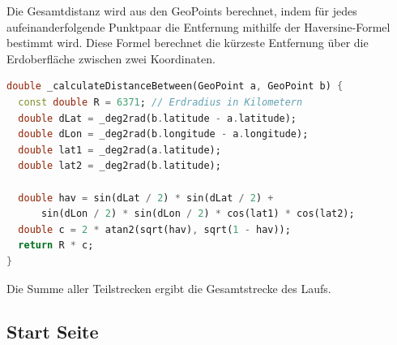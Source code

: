\documentclass[11pt,a4paper]{article}
\begin{document}
Die Gesamtdistanz wird aus den GeoPoints berechnet, indem für jedes aufeinanderfolgende Punktpaar die Entfernung mithilfe der Haversine-Formel bestimmt wird. Diese Formel berechnet die kürzeste Entfernung über die Erdoberfläche zwischen zwei Koordinaten.

\begin{lstlisting}[language=Dart, caption=Berechnung der Entfernung zweier GeoPoints]
double _calculateDistanceBetween(GeoPoint a, GeoPoint b) {
  const double R = 6371; // Erdradius in Kilometern
  double dLat = _deg2rad(b.latitude - a.latitude);
  double dLon = _deg2rad(b.longitude - a.longitude);
  double lat1 = _deg2rad(a.latitude);
  double lat2 = _deg2rad(b.latitude);

  double hav = sin(dLat / 2) * sin(dLat / 2) +
      sin(dLon / 2) * sin(dLon / 2) * cos(lat1) * cos(lat2);
  double c = 2 * atan2(sqrt(hav), sqrt(1 - hav));
  return R * c;
}
\end{lstlisting}

Die Summe aller Teilstrecken ergibt die Gesamtstrecke des Laufs.

\subsection{Start Seite}
\newpage
\end{document}

